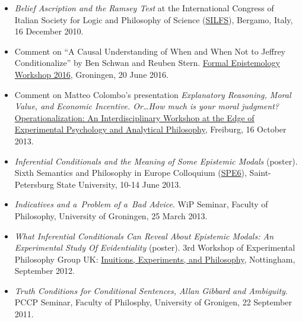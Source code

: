 \documentclass[a4paper,12pt]{article}
\begin{document}
\begin{small}
\begin{itemize}
    \item \emph{Belief Ascription and the Ramsey Test} at the International Congress of Italian Society for Logic and Philosophy of Science (\href{http://dinamico2.unibg.it/silfs/convegno2010.htm}{SILFS}), Bergamo, Italy, 16 December 2010. 
  \end{itemize}
  

  \begin{itemize}
  \item Comment on  ``A Causal Understanding of When and When Not to Jeffrey Conditionalize'' by Ben Schwan and Reuben Stern. \href{http://www.philos.rug.nl/few2016/}{Formal Epistemology Workshop 2016}, Groningen, 20 June 2016.


  \item Comment on Matteo Colombo's presentation \emph{Explanatory Reasoning, Moral Value, and Economic Incentive. Or\ldots How much is your moral judgment?} 
    \href{http://www.psychologie.uni-freiburg.de/Members/singmann/operational2013}{Operationalization: An Interdisciplinary Workshop at the Edge of Experimental Psychology and Analytical Philosophy}, Freiburg, 16 October 2013.

  \item \emph{Inferential Conditionals and the Meaning of Some
      Epistemic Modals} (poster). Sixth Semantics and Philosophy
    in Europe Colloquium
    (\href{http://spe6conference.wordpress.com}{SPE6}),
    Saint-Petersburg State University, 10-14 June 2013.
    
  \item \emph{Indicatives and a~Problem of a~Bad Advice}. WiP
    Seminar, Faculty of Philosophy, University of Groningen, 25 March
    2013.
    
  \item \emph{What Inferential Conditionals Can Reveal About Epistemic
      Modals: An Experimental Study Of Evidentiality} (poster).
    3rd Workshop of Experimental Philosophy Group UK:
    \href{https://www.nottingham.ac.uk/philosophy/research/conferences/workshop-intuitions-experimentsandphilosophy.aspx}{Inuitions, Experiments, and Philosophy}, Nottingham, September 2012.

  \item \emph{Truth Conditions for Conditional Sentences, Allan
      Gibbard and Ambiguity}. PCCP Seminar, Faculty of
    Philosphy, University of Gronigen, 22 September 2011.
    

\end{itemize}
\end{small}
\end{document}
